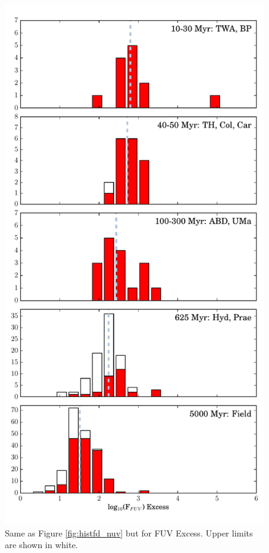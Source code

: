 \documentclass[twocolumn]{aastex62}
\begin{document}
\begin{figure}[t]
\centering
\includegraphics[width=\linewidth]{histfd_FUV.pdf}
\caption{Same as Figure \ref{fig:histfd_nuv} but for FUV Excess. Upper limits are shown in white. \label{fig:histfd_fuv}}
\end{figure}
\end{document}
